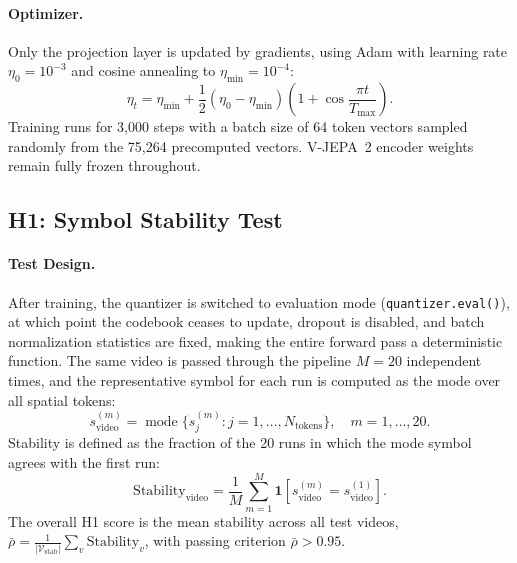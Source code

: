 \documentclass{article}
\begin{document}
\paragraph{Optimizer.}
Only the projection layer is updated by gradients, using Adam with learning rate
$\eta_0 = 10^{-3}$ and cosine annealing to $\eta_{\min} = 10^{-4}$:
%
\begin{equation}
  \eta_t
  = \eta_{\min}
  + \frac{1}{2}(\eta_0 - \eta_{\min})
    \left(1 + \cos\frac{\pi t}{T_{\max}}\right).
\end{equation}
%
Training runs for 3,000 steps with a batch size of 64 token vectors sampled
randomly from the 75,264 precomputed vectors.  V-JEPA~2 encoder weights remain
fully frozen throughout.

\subsection{H1: Symbol Stability Test}\label{sec:h1_stability}

\paragraph{Test Design.}
After training, the quantizer is switched to evaluation mode
(\texttt{quantizer.eval()}), at which point the codebook ceases to update,
dropout is disabled, and batch normalization statistics are fixed, making the
entire forward pass a deterministic function.  The same video is passed through
the pipeline $M = 20$ independent times, and the representative symbol for each
run is computed as the mode over all spatial tokens:
%
\begin{equation}
  s_{\text{video}}^{(m)}
  = \operatorname{mode}\bigl\{s_j^{(m)} : j = 1, \ldots, N_{\text{tokens}}\bigr\},
  \quad m = 1, \ldots, 20.
\end{equation}
%
Stability is defined as the fraction of the 20 runs in which the mode symbol
agrees with the first run:
%
\begin{equation}
  \text{Stability}_{\text{video}}
  = \frac{1}{M}\sum_{m=1}^{M}
    \mathbf{1}\!\left[s_{\text{video}}^{(m)} = s_{\text{video}}^{(1)}\right].
\end{equation}
%
The overall H1 score is the mean stability across all test videos,
$\bar{\rho} = \frac{1}{|\mathcal{V}_{\text{stab}}|}\sum_{v}\text{Stability}_v$,
with passing criterion $\bar{\rho} > 0.95$.
\end{document}
